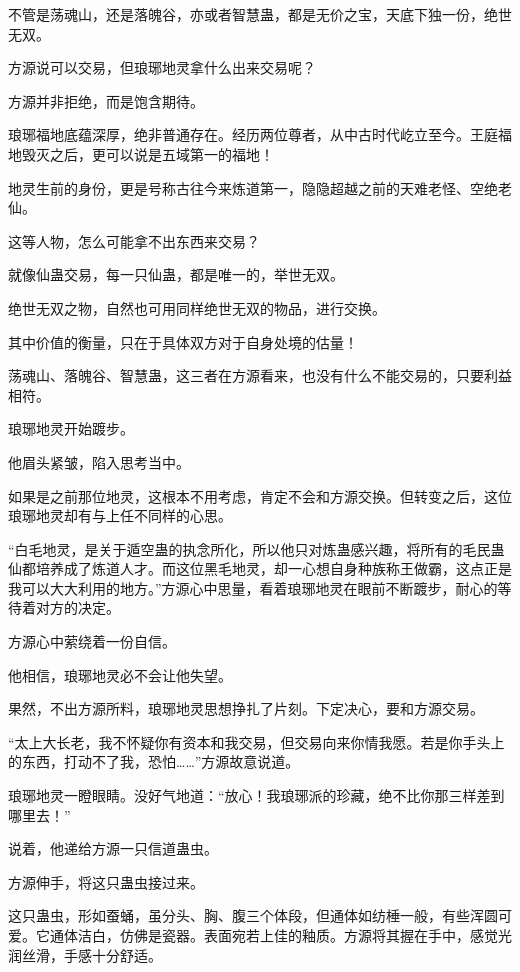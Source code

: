 
\begin{this_body}

不管是荡魂山，还是落魄谷，亦或者智慧蛊，都是无价之宝，天底下独一份，绝世无双。

方源说可以交易，但琅琊地灵拿什么出来交易呢？

方源并非拒绝，而是饱含期待。

琅琊福地底蕴深厚，绝非普通存在。经历两位尊者，从中古时代屹立至今。王庭福地毁灭之后，更可以说是五域第一的福地！

地灵生前的身份，更是号称古往今来炼道第一，隐隐超越之前的天难老怪、空绝老仙。

这等人物，怎么可能拿不出东西来交易？

就像仙蛊交易，每一只仙蛊，都是唯一的，举世无双。

绝世无双之物，自然也可用同样绝世无双的物品，进行交换。

其中价值的衡量，只在于具体双方对于自身处境的估量！

荡魂山、落魄谷、智慧蛊，这三者在方源看来，也没有什么不能交易的，只要利益相符。

琅琊地灵开始踱步。

他眉头紧皱，陷入思考当中。

如果是之前那位地灵，这根本不用考虑，肯定不会和方源交换。但转变之后，这位琅琊地灵却有与上任不同样的心思。

“白毛地灵，是关于遁空蛊的执念所化，所以他只对炼蛊感兴趣，将所有的毛民蛊仙都培养成了炼道人才。而这位黑毛地灵，却一心想自身种族称王做霸，这点正是我可以大大利用的地方。”方源心中思量，看着琅琊地灵在眼前不断踱步，耐心的等待着对方的决定。

方源心中萦绕着一份自信。

他相信，琅琊地灵必不会让他失望。

果然，不出方源所料，琅琊地灵思想挣扎了片刻。下定决心，要和方源交易。

“太上大长老，我不怀疑你有资本和我交易，但交易向来你情我愿。若是你手头上的东西，打动不了我，恐怕……”方源故意说道。

琅琊地灵一瞪眼睛。没好气地道：“放心！我琅琊派的珍藏，绝不比你那三样差到哪里去！”

说着，他递给方源一只信道蛊虫。

方源伸手，将这只蛊虫接过来。

这只蛊虫，形如蚕蛹，虽分头、胸、腹三个体段，但通体如纺棰一般，有些浑圆可爱。它通体洁白，仿佛是瓷器。表面宛若上佳的釉质。方源将其握在手中，感觉光润丝滑，手感十分舒适。


\end{this_body}
